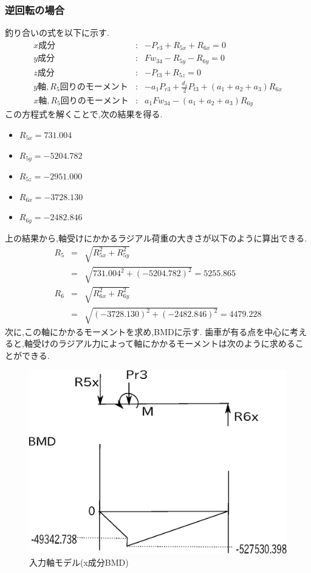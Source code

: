 \documentclass[a4j,twoside,openright,11pt]{jreport}
\begin{document}
\subsubsection{逆回転の場合}
釣り合いの式を以下に示す.
\begin{eqnarray}
x成分&:&-P_{r3}+R_{5x}+R_{6x}=0\\
y成分&:&Fw_{34}-R_{5y}-R_{6y}=0\\
z成分&:&-P_{t3}+R_{5z}=0\\
y軸,R_5回りのモーメント&:&-a_1P_{r3}+\frac{d_4}{2}P_{t3}+(a_1+a_2+a_3)R_{6x}\\
x軸,R_5回りのモーメント&:&a_1Fw_{34}-(a_1+a_2+a_3)R_{6y}
\end{eqnarray}
この方程式を解くことで,次の結果を得る.
\begin{itemize}
\item $R_{5x}=731.004$
\item $R_{5y}=-5204.782$
\item $R_{5z}=-2951.000$
\item $R_{6x}=-3728.130$
\item $R_{6y}=-2482.846$
\end{itemize}
上の結果から,軸受けにかかるラジアル荷重の大きさが以下のように算出できる.
\begin{eqnarray}
R_5 &=& \sqrt {R_{5x}^2+R_{5y}^2}\\
    &=& \sqrt {731.004^2+(-5204.782)^2}=5255.865\\
R_6 &=& \sqrt {R_{6x}^2+R_{6y}^2}\\
    &=& \sqrt {(-3728.130)^2+(-2482.846)^2}=4479.228
\end{eqnarray}
次に,この軸にかかるモーメントを求め,BMDに示す.
歯車が有る点を中心に考えると,軸受けのラジアル力によって軸にかかるモーメントは次のように求めることができる.
\begin{figure}[htbp]
\begin{center}
\includegraphics[width=12cm]{jiku342.eps}
\end{center}
\caption{入力軸モデル(x成分BMD)}
\end{figure}
\end{document}
